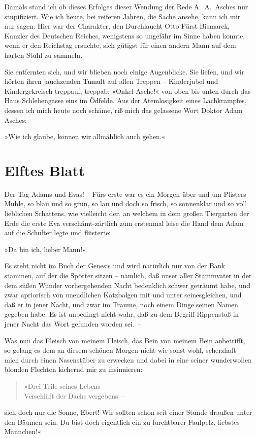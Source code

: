 Damals stand ich ob dieses Erfolges dieser Wendung der Rede
A.~A.~Asches nur stupifiziert. Wie ich heute, bei reiferen Jahren,
die Sache ansehe, kann ich mir nur sagen: Hier war der Charakter,
den Durchlaucht Otto Fürst Bismarck, Kanzler des Deutschen Reiches,
wenigstens so ungefähr im Sinne haben konnte, wenn er den Reichstag
ersuchte, sich gütigst für einen andern Mann auf dem harten Stuhl
zu sammeln.

Sie entfernten sich, und wir blieben noch einige Augenblicke. Sie
liefen, und wir hörten ihren jauchzenden Tumult auf allen Treppen –
Kinderjubel und Kindergekreisch treppauf, treppab: »Onkel Asche!«
von oben bis unten durch das Haus Schlehengasse eins im Ödfelde.
Aus der Atemlosigkeit eines Lachkrampfes, dessen ich mich heute
noch schäme, riß mich das gelassene Wort Doktor Adam Asches:

»Wie ich glaube, können wir allmählich auch gehen.«

\section{Elftes Blatt}

Der Tag Adams und Evas! – Fürs erste war es ein Morgen über und um
Pfisters Mühle, so blau und so grün, so lau und doch so frisch, so
sonnenklar und so voll lieblichen Schattens, wie vielleicht der, an
welchem in dem großen Tiergarten der Erde die erste Eva
verschämt-zärtlich zum erstenmal leise die Hand dem Adam auf die
Schulter legte und flüsterte:

»Da bin ich, lieber Mann!«

Es steht nicht im Buch der Genesis und wird natürlich nur von der
Bank stammen, auf der die Spötter sitzen – nämlich, daß unser aller
Stammvater in der dem süßen Wunder vorhergehenden Nacht bedenklich
schwer geträumt habe, und zwar apriorisch von unendlichen
Katzbalgen mit und unter seinesgleichen, und daß er in jener Nacht,
und zwar im Traume, noch einem Dinge seinen Namen gegeben habe. Es
ist unbedingt nicht wahr, daß zu dem Begriff Rippenstoß in jener
Nacht das Wort gefunden worden sei.~–

Was nun das Fleisch von meinem Fleisch, das Bein von meinem Bein
anbetrifft, so gelang es dem an diesem schönen Morgen nicht wie
sonst wohl, scherzhaft mich durch einen Nasenstüber zu erwecken und
dabei in eine seiner wunderwollen blonden Flechten kichernd mir zu
insinuieren:

\begin{verse}
»Drei Teile seines Lebens\\
Verschläft der Dachs vergebens~–
\end{verse}
\noindent
sieh doch nur die Sonne, Ebert! Wir sollten schon seit einer
Stunde draußen unter den Bäumen sein. Du bist doch eigentlich ein
zu furchtbarer Faulpelz, liebstes Männchen!«

